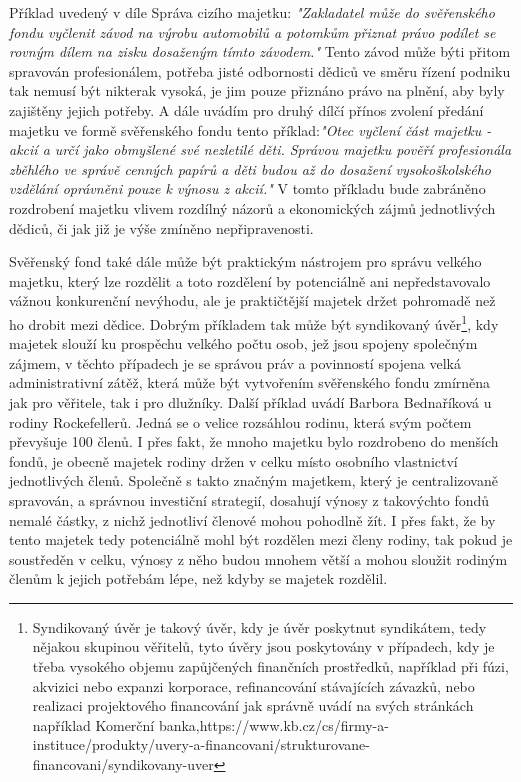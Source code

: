 \documentclass{article}
\begin{document}
 
 Příklad uvedený v díle Správa cizího majetku: \textit{"Zakladatel může  do svěřenského fondu vyčlenit závod na výrobu automobilů a potomkům přiznat právo podílet se rovným dílem na zisku dosaženým tímto závodem."} Tento závod může býti přitom spravován profesionálem, potřeba jisté odbornosti dědiců ve směru řízení podniku tak nemusí být nikterak vysoká, je jim pouze přiznáno právo na plnění, aby byly zajištěny jejich potřeby. A dále uvádím pro druhý dílčí přínos zvolení předání majetku ve formě svěřenského fondu tento příklad:\textit{"Otec vyčlení část majetku - akcií a určí jako obmyšlené své nezletilé děti. Správou majetku pověří profesionála zběhlého ve správě cenných papírů a děti budou až do dosažení vysokoškolského vzdělání oprávněni pouze k výnosu z akcií."} V tomto příkladu bude zabráněno rozdrobení majetku vlivem rozdílný názorů a ekonomických zájmů jednotlivých dědiců, či jak již je výše zmíněno nepřipravenosti.\\
 
 \newpage
 \thispagestyle{smallertextinheader}
 
 Svěřenský fond také dále může být praktickým nástrojem pro správu velkého majetku, který lze rozdělit a toto rozdělení by potenciálně ani nepředstavovalo vážnou konkurenční nevýhodu, ale je praktičtější majetek držet pohromadě než ho drobit mezi dědice. Dobrým příkladem tak může být syndikovaný úvěr\footnote{Syndikovaný úvěr je takový úvěr, kdy je úvěr poskytnut syndikátem, tedy nějakou skupinou věřitelů, tyto úvěry jsou poskytovány v případech, kdy je třeba vysokého objemu zapůjčených finančních prostředků, například při fúzi, akvizici nebo expanzi korporace, refinancování stávajících závazků, nebo realizaci projektového financování jak správně uvádí na svých stránkách například Komerční banka,https://www.kb.cz/cs/firmy-a-instituce/produkty/uvery-a-financovani/strukturovane-financovani/syndikovany-uver}, kdy majetek slouží ku prospěchu velkého počtu osob, jež jsou spojeny společným zájmem, v těchto případech je se správou práv a povinností spojena velká administrativní zátěž, která může být vytvořením svěřenského fondu zmírněna jak pro věřitele, tak i pro dlužníky. Další příklad uvádí Barbora Bednaříková u rodiny Rockefellerů. Jedná se o velice rozsáhlou rodinu, která svým počtem převyšuje 100 členů. I přes fakt, že mnoho majetku bylo rozdrobeno do menších fondů, je obecně majetek rodiny držen v celku místo osobního vlastnictví jednotlivých členů. Společně s takto značným majetkem, který je centralizovaně spravován, a správnou investiční strategií, dosahují výnosy z takovýchto fondů nemalé částky, z nichž jednotliví členové mohou pohodlně žít. I přes fakt, že by tento majetek tedy potenciálně mohl být rozdělen mezi členy rodiny, tak pokud je soustředěn v celku, výnosy z něho budou mnohem větší a mohou sloužit rodiným členům k jejich potřebám lépe, než kdyby se majetek rozdělil.
 
\end{document}
